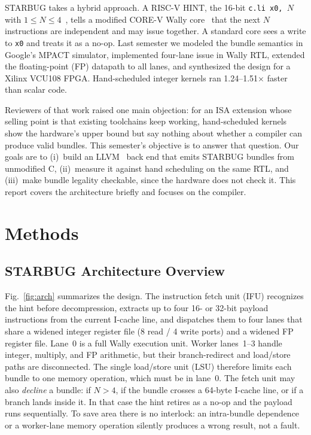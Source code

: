 \documentclass[conference]{IEEEtran}
\newcommand{\hint}{\texttt{c.li x0,\,$N$}}
\begin{document}
STARBUG takes a hybrid approach. A RISC-V HINT, the 16-bit \hint{} with $1\le N\le 4$~\cite{riscv-unpriv}, tells a modified CORE-V Wally core~\cite{corev-wally,harris-socdesign-2025} that the next $N$ instructions are independent and may issue together. A standard core sees a write to \texttt{x0} and treats it as a no-op. Last semester we modeled the bundle semantics in Google's MPACT simulator, implemented four-lane issue in Wally RTL, extended the floating-point (FP) datapath to all lanes, and synthesized the design for a Xilinx VCU108 FPGA. Hand-scheduled integer kernels ran 1.24--1.51$\times$ faster than scalar code.

Reviewers of that work raised one main objection: for an ISA extension whose selling point is that existing toolchains keep working, hand-scheduled kernels show the hardware's upper bound but say nothing about whether a compiler can produce valid bundles. This semester's objective is to answer that question. Our goals are to (i)~build an LLVM~\cite{lattner-llvm-2004} back end that emits STARBUG bundles from unmodified C, (ii)~measure it against hand scheduling on the same RTL, and (iii)~make bundle legality checkable, since the hardware does not check it. This report covers the architecture briefly and focuses on the compiler.

\section{Methods}

\subsection{STARBUG Architecture Overview}
Fig.~\ref{fig:arch} summarizes the design. The instruction fetch unit (IFU) recognizes the hint before decompression, extracts up to four 16- or 32-bit payload instructions from the current I-cache line, and dispatches them to four lanes that share a widened integer register file (8 read / 4 write ports) and a widened FP register file. Lane~0 is a full Wally execution unit. Worker lanes~1--3 handle integer, multiply, and FP arithmetic, but their branch-redirect and load/store paths are disconnected. The single load/store unit (LSU) therefore limits each bundle to one memory operation, which must be in lane~0. The fetch unit may also \emph{decline} a bundle: if $N>4$, if the bundle crosses a 64-byte I-cache line, or if a branch lands inside it. In that case the hint retires as a no-op and the payload runs sequentially. To save area there is no interlock: an intra-bundle dependence or a worker-lane memory operation silently produces a wrong result, not a fault.
\end{document}
